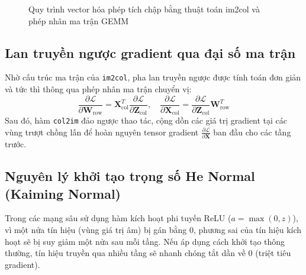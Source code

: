\documentclass[12pt,a4paper]{report}
\begin{document}
\begin{figure}[H]
\centering
{}
\caption{Quy trình vector hóa phép tích chập bằng thuật toán im2col và phép nhân ma trận GEMM}
\label{fig:im2col_flow}
\end{figure}

\subsection{Lan truyền ngược gradient qua đại số ma trận}
Nhờ cấu trúc ma trận của \texttt{im2col}, pha lan truyền ngược được tính toán đơn giản và tức thì thông qua phép nhân ma trận chuyển vị:
\begin{equation}
    \frac{\partial \mathcal{L}}{\partial \mathbf{W}_{\text{row}}} = \mathbf{X}_{\text{col}}^T \frac{\partial \mathcal{L}}{\partial \mathbf{Z}_{\text{col}}}, \quad \frac{\partial \mathcal{L}}{\partial \mathbf{X}_{\text{col}}} = \frac{\partial \mathcal{L}}{\partial \mathbf{Z}_{\text{col}}} \mathbf{W}_{\text{row}}^T
\end{equation}
Sau đó, hàm \texttt{col2im} đảo ngược thao tác, cộng dồn các giá trị gradient tại các vùng trượt chồng lấn để hoàn nguyên tensor gradient $\frac{\partial \mathcal{L}}{\partial \mathbf{X}}$ ban đầu cho các tầng trước.

\subsection{Nguyên lý khởi tạo trọng số He Normal (Kaiming Normal)}
Trong các mạng sâu sử dụng hàm kích hoạt phi tuyến ReLU ($a = \max(0, z)$), vì một nửa tín hiệu (vùng giá trị âm) bị gán bằng 0, phương sai của tín hiệu kích hoạt sẽ bị suy giảm một nửa sau mỗi tầng. Nếu áp dụng cách khởi tạo thông thường, tín hiệu truyền qua nhiều tầng sẽ nhanh chóng tắt dần về 0 (triệt tiêu gradient).
\end{document}
